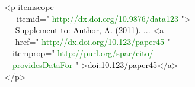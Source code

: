 \raggedright\small\bgroup\ttfamily\frenchspacing
<p \textcolor{dccblue}{itemscope\\~~~itemid="}%
\textcolor{Green}{http://dx.doi.org/10.9876/data123}%
\textcolor{dccblue}{"}>\\~~%
\textcolor{black}{Supplement to: Author, A. (2011). ... }<a\\~~%
\textcolor{dccblue}{href="}%
\textcolor{Green}{http://dx.doi.org/10.123/paper45}%
\textcolor{dccblue}{"\\~~itemprop="}%
\textcolor{Green}{http://purl.org/spar/cito/\\~~providesDataFor}%
\textcolor{dccblue}{"}%
>\textcolor{black}{doi:10.123/paper45}</a>\\</p>\egroup